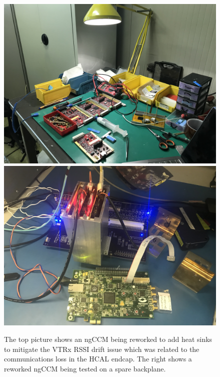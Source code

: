 \begin{figure}[!htbp]
	\centering
    \caption{The top picture shows an ngCCM being reworked to add heat sinks to mitigate the VTRx RSSI drift issue which was related to the communications loss in the HCAL endcap. The right shows a reworked ngCCM being tested on a spare backplane.}
	\includegraphics[scale=0.08]{fig/coolingfins.jpg}
    \includegraphics[scale=0.08]{fig/testing.jpg}
	\label{fig:BackendCrate9042}
\end{figure}

